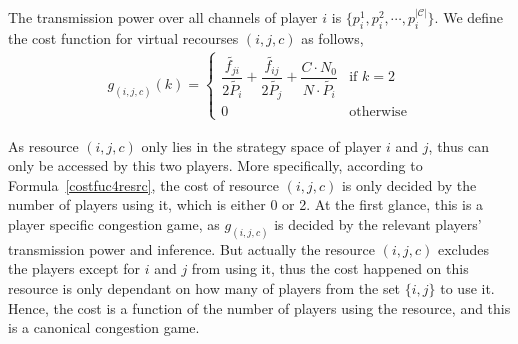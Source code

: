 The transmission power over all channels of player $i$ is $\{p_i^1, p_i^2,\cdots, p_i^{|\mathcal{C}|}\}$.
We define the cost function for virtual recourses $(i,j,c)$ as follows,
\begin{equation}
\label{costfuc4resrc}
\begin{split}
g_{(i,j,c)}(k) = 
\left\{ \begin{array}{ll}
\dfrac{\tilde{f_{ji}}}{2\tilde{P_i}} + \dfrac{\tilde{f_{ij}}}{2\tilde{P_j}} + \dfrac{C\cdot N_0}{N\cdot \tilde{P_i}} & \mbox{if $k=2$} \\
0 & \mbox{otherwise}
\end{array}
\right.
\end{split}
\end{equation}


As resource $(i,j,c)$ only lies in the strategy space of player $i$ and $j$, thus can only be accessed by this two players.
More specifically, according to Formula~\ref{costfuc4resrc}, the cost of resource $(i,j,c)$ is only decided by the number of players using it, which is either 0 or 2.
At the first glance, this is a player specific congestion game, as $g_{(i,j,c)}$ is decided by the relevant players' transmission power and inference.
But actually the resource ${(i,j,c)}$ excludes the players except for $i$ and $j$ from using it, thus the cost happened on this resource is only dependant on how many of players from the set $\{i, j\}$ to use it.
Hence, the cost is a function of the number of players using the resource, and this is a canonical congestion game.

